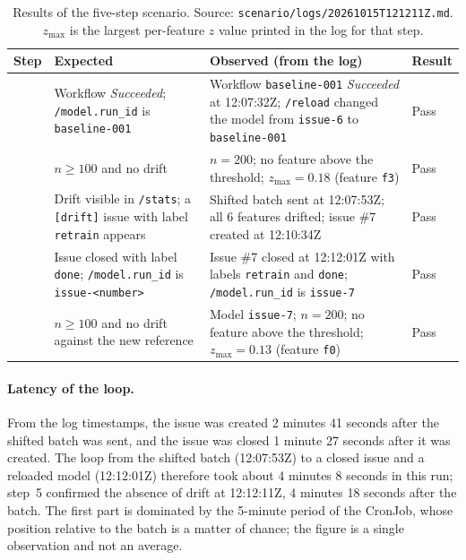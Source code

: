 \begin{table}[htbp]
\centering
\small
\caption{Results of the five-step scenario. Source: \texttt{scenario/logs/20261015T121211Z.md}. $z_{\max}$ is the largest per-feature $z$ value printed in the log for that step.}
\label{tab:poc-results}
\begin{tabular}{@{}>{\centering\arraybackslash}p{0.8cm} >{\raggedright\arraybackslash}p{4.4cm} >{\raggedright\arraybackslash}p{6.4cm} >{\centering\arraybackslash}p{1.2cm}@{}}
\toprule
Step & Expected & Observed (from the log) & Result \\
\midrule
1 & Workflow \emph{Succeeded}; \texttt{/model.run\_id} is \texttt{baseline-001} & Workflow \texttt{baseline-001} \emph{Succeeded} at 12:07:32Z; \texttt{/reload} changed the model from \texttt{issue-6} to \texttt{baseline-001} & Pass \\
2 & $n \ge 100$ and no drift & $n = 200$; no feature above the threshold; $z_{\max} = 0.18$ (feature \texttt{f3}) & Pass \\
3 & Drift visible in \texttt{/stats}; a \texttt{[drift]} issue with label \texttt{retrain} appears & Shifted batch sent at 12:07:53Z; all 6 features drifted; issue \#7 created at 12:10:34Z & Pass \\
4 & Issue closed with label \texttt{done}; \texttt{/model.run\_id} is \texttt{issue-<number>} & Issue \#7 closed at 12:12:01Z with labels \texttt{retrain} and \texttt{done}; \texttt{/model.run\_id} is \texttt{issue-7} & Pass \\
5 & $n \ge 100$ and no drift against the new reference & Model \texttt{issue-7}; $n = 200$; no feature above the threshold; $z_{\max} = 0.13$ (feature \texttt{f0}) & Pass \\
\bottomrule
\end{tabular}
\end{table}

\paragraph{Latency of the loop.} From the log timestamps, the issue was created 2 minutes 41 seconds after the shifted batch was sent, and the issue was closed 1 minute 27 seconds after it was created. The loop from the shifted batch (12:07:53Z) to a closed issue and a reloaded model (12:12:01Z) therefore took about 4 minutes 8 seconds in this run; step~5 confirmed the absence of drift at 12:12:11Z, 4 minutes 18 seconds after the batch. The first part is dominated by the 5-minute period of the CronJob, whose position relative to the batch is a matter of chance; the figure is a single observation and not an average.

